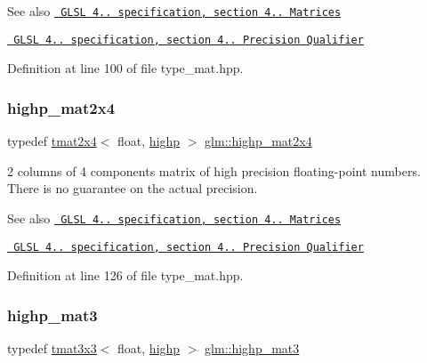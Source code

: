 \begin{DoxySeeAlso}{See also}
\href{http://www.opengl.org/registry/doc/GLSLangSpec.4.20.8.pdf}{\texttt{ G\+L\+SL 4.. specification, section 4.. Matrices}} 

\href{http://www.opengl.org/registry/doc/GLSLangSpec.4.20.8.pdf}{\texttt{ G\+L\+SL 4.. specification, section 4.. Precision Qualifier}} 
\end{DoxySeeAlso}


Definition at line 100 of file type\+\_\+mat.\+hpp.

\mbox{\label{group__core__precision_ga74ae75c71c8c2b775714fb24454d6096}} 
\subsubsection{\texorpdfstring{highp\_mat2x4}{highp\_mat2x4}}
{\footnotesize\ttfamily typedef \mbox{\hyperlink{structglm_1_1tmat2x4}{tmat2x4}}$<$ float, \mbox{\hyperlink{namespaceglm_a0f04f086094c747d227af4425893f545ac6f7eab42eacbb10d59a58e95e362074}{highp}} $>$ \mbox{\hyperlink{group__core__precision_ga74ae75c71c8c2b775714fb24454d6096}{glm\+::highp\+\_\+mat2x4}}}

2 columns of 4 components matrix of high precision floating-\/point numbers. There is no guarantee on the actual precision.

\begin{DoxySeeAlso}{See also}
\href{http://www.opengl.org/registry/doc/GLSLangSpec.4.20.8.pdf}{\texttt{ G\+L\+SL 4.. specification, section 4.. Matrices}} 

\href{http://www.opengl.org/registry/doc/GLSLangSpec.4.20.8.pdf}{\texttt{ G\+L\+SL 4.. specification, section 4.. Precision Qualifier}} 
\end{DoxySeeAlso}


Definition at line 126 of file type\+\_\+mat.\+hpp.

\mbox{\label{group__core__precision_ga5822a3dc6f6d421ee0b6a3c7f41a3ff1}} 
\subsubsection{\texorpdfstring{highp\_mat3}{highp\_mat3}}
{\footnotesize\ttfamily typedef \mbox{\hyperlink{structglm_1_1tmat3x3}{tmat3x3}}$<$ float, \mbox{\hyperlink{namespaceglm_a0f04f086094c747d227af4425893f545ac6f7eab42eacbb10d59a58e95e362074}{highp}} $>$ \mbox{\hyperlink{group__core__precision_ga5822a3dc6f6d421ee0b6a3c7f41a3ff1}{glm\+::highp\+\_\+mat3}}}

